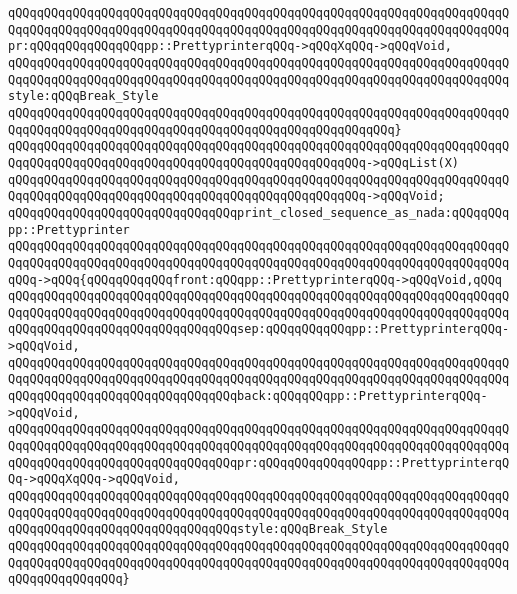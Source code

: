 \verb|qQQqqQQqqQQqqQQqqQQqqQQqqQQqqQQqqQQqqQQqqQQqqQQqqQQqqQQqqQQqqQQqqQQqqQQqqQQqqQQqqQQqqQQqqQQqqQQqqQQqqQQqqQQqqQQqqQQqqQQqqQQqqQQqqQQqqQQqqQQqpr:qQQqqQQqqQQqqQQqpp::PrettyprinterqQQq->qQQqXqQQq->qQQqVoid,|\newline
\verb|qQQqqQQqqQQqqQQqqQQqqQQqqQQqqQQqqQQqqQQqqQQqqQQqqQQqqQQqqQQqqQQqqQQqqQQqqQQqqQQqqQQqqQQqqQQqqQQqqQQqqQQqqQQqqQQqqQQqqQQqqQQqqQQqqQQqqQQqqQQqstyle:qQQqBreak_Style|\newline
\verb|qQQqqQQqqQQqqQQqqQQqqQQqqQQqqQQqqQQqqQQqqQQqqQQqqQQqqQQqqQQqqQQqqQQqqQQqqQQqqQQqqQQqqQQqqQQqqQQqqQQqqQQqqQQqqQQqqQQqqQQqqQQq}|\newline
\verb|qQQqqQQqqQQqqQQqqQQqqQQqqQQqqQQqqQQqqQQqqQQqqQQqqQQqqQQqqQQqqQQqqQQqqQQqqQQqqQQqqQQqqQQqqQQqqQQqqQQqqQQqqQQqqQQqqQQqqQQq->qQQqList(X)|\newline
\verb|qQQqqQQqqQQqqQQqqQQqqQQqqQQqqQQqqQQqqQQqqQQqqQQqqQQqqQQqqQQqqQQqqQQqqQQqqQQqqQQqqQQqqQQqqQQqqQQqqQQqqQQqqQQqqQQqqQQqqQQq->qQQqVoid;|\newline
\newline
\verb|qQQqqQQqqQQqqQQqqQQqqQQqqQQqqQQqprint_closed_sequence_as_nada:qQQqqQQqpp::Prettyprinter|\newline
\verb|qQQqqQQqqQQqqQQqqQQqqQQqqQQqqQQqqQQqqQQqqQQqqQQqqQQqqQQqqQQqqQQqqQQqqQQqqQQqqQQqqQQqqQQqqQQqqQQqqQQqqQQqqQQqqQQqqQQqqQQqqQQqqQQqqQQqqQQqqQQqqQQq->qQQq{qQQqqQQqqQQqfront:qQQqpp::PrettyprinterqQQq->qQQqVoid,qQQq|\newline
\verb|qQQqqQQqqQQqqQQqqQQqqQQqqQQqqQQqqQQqqQQqqQQqqQQqqQQqqQQqqQQqqQQqqQQqqQQqqQQqqQQqqQQqqQQqqQQqqQQqqQQqqQQqqQQqqQQqqQQqqQQqqQQqqQQqqQQqqQQqqQQqqQQqqQQqqQQqqQQqqQQqqQQqqQQqqQQqsep:qQQqqQQqqQQqpp::PrettyprinterqQQq->qQQqVoid,|\newline
\verb|qQQqqQQqqQQqqQQqqQQqqQQqqQQqqQQqqQQqqQQqqQQqqQQqqQQqqQQqqQQqqQQqqQQqqQQqqQQqqQQqqQQqqQQqqQQqqQQqqQQqqQQqqQQqqQQqqQQqqQQqqQQqqQQqqQQqqQQqqQQqqQQqqQQqqQQqqQQqqQQqqQQqqQQqqQQqback:qQQqqQQqpp::PrettyprinterqQQq->qQQqVoid,|\newline
\verb|qQQqqQQqqQQqqQQqqQQqqQQqqQQqqQQqqQQqqQQqqQQqqQQqqQQqqQQqqQQqqQQqqQQqqQQqqQQqqQQqqQQqqQQqqQQqqQQqqQQqqQQqqQQqqQQqqQQqqQQqqQQqqQQqqQQqqQQqqQQqqQQqqQQqqQQqqQQqqQQqqQQqqQQqqQQqpr:qQQqqQQqqQQqqQQqpp::PrettyprinterqQQq->qQQqXqQQq->qQQqVoid,|\newline
\verb|qQQqqQQqqQQqqQQqqQQqqQQqqQQqqQQqqQQqqQQqqQQqqQQqqQQqqQQqqQQqqQQqqQQqqQQqqQQqqQQqqQQqqQQqqQQqqQQqqQQqqQQqqQQqqQQqqQQqqQQqqQQqqQQqqQQqqQQqqQQqqQQqqQQqqQQqqQQqqQQqqQQqqQQqqQQqstyle:qQQqBreak_Style|\newline
\verb|qQQqqQQqqQQqqQQqqQQqqQQqqQQqqQQqqQQqqQQqqQQqqQQqqQQqqQQqqQQqqQQqqQQqqQQqqQQqqQQqqQQqqQQqqQQqqQQqqQQqqQQqqQQqqQQqqQQqqQQqqQQqqQQqqQQqqQQqqQQqqQQqqQQqqQQqqQQq}|\newline
